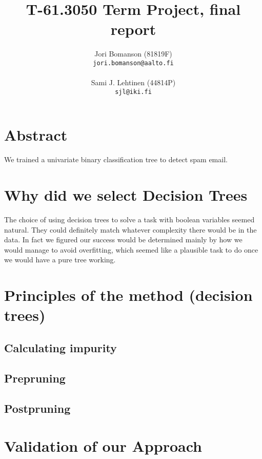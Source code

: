 \documentclass[a4paper,10pt]{article}
\title{T-61.3050 Term Project, final report} %
\author{Jori Bomanson (81819F) \\
  {\tt jori.bomanson@aalto.fi} \\
  \\
  Sami J. Lehtinen (44814P)\\ 
  {\tt sjl@iki.fi} \\
}
\begin{document}

\maketitle

\section*{Abstract}
We trained a univariate binary classification tree to detect spam email.


\section*{}

\section*{Why did we select Decision Trees}

The choice of using decision trees to solve a task with boolean variables
seemed natural. They could definitely match whatever complexity there would
be in the data. %
In fact we figured our success would be determined mainly by how we would
manage to avoid overfitting, which seemed like a plausible task to do once
we would have a pure tree working.


\section*{Principles of the method (decision trees)}


\subsection*{Calculating impurity}

\subsection*{Prepruning}

\subsection*{Postpruning}

\section*{Validation of our Approach}
\end{document}
